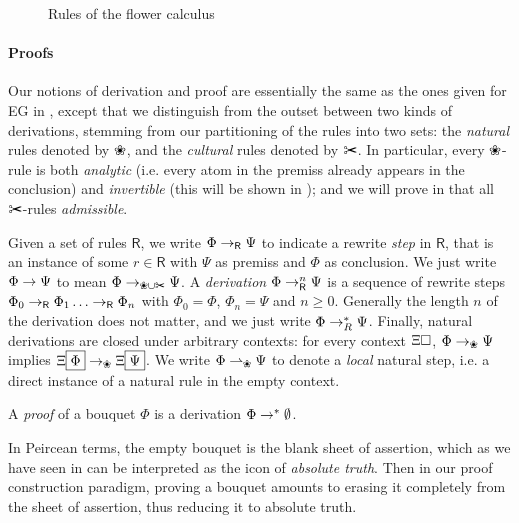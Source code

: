 \begin{figure*}[h!]
  
  \caption{Rules of the flower calculus}
\end{figure*}

\paragraph{Proofs}

Our notions of derivation and proof are essentially the same as the ones given
for EG in , except that we distinguish from the outset between
two kinds of derivations, stemming from our partitioning of the rules into two
sets: the \emph{natural} rules denoted by $\Nature$, and the \emph{cultural}
rules denoted by $\Culture$. In particular, every $\Nature$-rule is both
\emph{analytic} (i.e. every atom in the premiss already appears in the
conclusion) and \emph{invertible} (this will be shown in );
and we will prove in  that all $\Culture$-rules
\emph{admissible}.

\begin{definition}[Derivation]
  Given a set of rules $\mathsf{R}$, we write $\Phi \rightarrow_{\mathsf{R}} \Psi$ to
  indicate a rewrite \emph{step} in $\mathsf{R}$, that is an instance of some $r
  \in \mathsf{R}$ with $\Psi$ as premiss and $\Phi$ as conclusion. We just write
  $\Phi \rightarrow \Psi$ to mean $\Phi \step_{\Nature\cup\Culture} \Psi$. A
  \emph{derivation} $\Phi \rightarrow^{n}_{\mathsf{R}} \Psi$ is a sequence of rewrite
  steps $\Phi_0 \rightarrow_{\mathsf{R}} \Phi_1 \ldots \rightarrow_{\mathsf{R}} \Phi_n$ with
  $\Phi_0 = \Phi$, $\Phi_n = \Psi$ and $n \geq 0$. Generally the length $n$ of
  the derivation does not matter, and we just write $\Phi \rightarrow^\ast_R \Psi$.
  Finally, natural derivations are closed under arbitrary contexts: for every
  context $\Xi\square$, $\Phi \step_\Nature \Psi$ implies $\cfill{\Xi}{\Phi}
  \step_\Nature \cfill{\Xi}{\Psi}$. We write $\Phi \lstep_{\Nature} \Psi$ to
  denote a \emph{local} natural step, i.e. a direct instance of a natural rule
  in the empty context.
\end{definition}

\begin{definition}[Proof]
  A \emph{proof} of a bouquet $\Phi$ is a derivation $\Phi \rightarrow^\ast \emptyset$.
\end{definition}

In Peircean terms, the empty bouquet is the blank sheet of assertion, which as
we have seen in  can be interpreted as the icon of \emph{absolute
truth}. Then in our proof construction paradigm, proving a bouquet amounts to
erasing it completely from the sheet of assertion, thus reducing it to absolute
truth.

